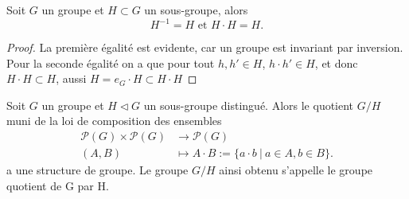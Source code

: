\begin{lem}
	\label{hh-h}
	Soit $G$ un groupe et $H \subset G$ un sous-groupe, alors
	\begin{equation*}
		H^{-1} = H \textrm{ et } H \cdot H = H.
	\end{equation*}
\end{lem}
\begin{proof}
	La première égalité est evidente, car un groupe est invariant par inversion.
	Pour la seconde égalité on a que pour tout $h, h' \in H$, $h \cdot h' \in H$,
	et donc $H \cdot H \subset H$, aussi $H = {e_G} \cdot H \subset H \cdot H$
\end{proof}


\begin{thm}
	\label{existence-quotient}
	Soit $G$ un groupe et $H \triangleleft G$ un sous-groupe distingué.
	Alors le quotient $G/H$ muni de la loi de composition des ensembles
	\begin{align*}
		\mathcal{P}(G) \times \mathcal{P}(G) &\to \mathcal{P}(G)\\
		(A, B) &\mapsto A \cdot B := \{a \cdot b\ |\ a \in A, b \in B\}.
	\end{align*}
	a une structure de groupe. Le groupe $G/H$ ainsi obtenu
	s'appelle le groupe quotient de G par H.
\end{thm}

